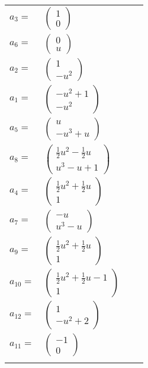 \documentclass[1p]{elsarticle_modified}
\theoremstyle{definition}
\begin{document}
\begin{tabular}{m{7pt} m{180pt} m{7pt} m{180pt} }
\flushright $a_{3}=$&$\begin{pmatrix}1\\0\end{pmatrix}$ \\
\flushright $a_{6}=$&$\begin{pmatrix}0\\u\end{pmatrix}$ \\
\flushright $a_{2}=$&$\begin{pmatrix}1\\- u^2\end{pmatrix}$ \\
\flushright $a_{1}=$&$\begin{pmatrix}- u^2+1\\- u^2\end{pmatrix}$ \\
\flushright $a_{5}=$&$\begin{pmatrix}u\\- u^3+u\end{pmatrix}$ \\
\flushright $a_{8}=$&$\begin{pmatrix}\frac{1}{2} u^2-\frac{1}{2} u\\u^3- u+1\end{pmatrix}$ \\
\flushright $a_{4}=$&$\begin{pmatrix}\frac{1}{2} u^2+\frac{1}{2} u\\1\end{pmatrix}$ \\
\flushright $a_{7}=$&$\begin{pmatrix}- u\\u^3- u\end{pmatrix}$ \\
\flushright $a_{9}=$&$\begin{pmatrix}\frac{1}{2} u^2+\frac{1}{2} u\\1\end{pmatrix}$ \\
\flushright $a_{10}=$&$\begin{pmatrix}\frac{1}{2} u^2+\frac{1}{2} u-1\\1\end{pmatrix}$ \\
\flushright $a_{12}=$&$\begin{pmatrix}1\\- u^2+2\end{pmatrix}$ \\
\flushright $a_{11}=$&$\begin{pmatrix}-1\\0\end{pmatrix}$\\&\end{tabular}
\end{document}
